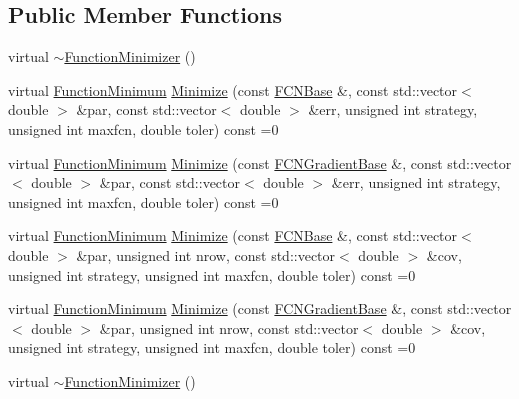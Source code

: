 \subsection*{Public Member Functions}
\begin{DoxyCompactItemize}
\item 
virtual \mbox{\hyperlink{classROOT_1_1Minuit2_1_1FunctionMinimizer_a804a5a18f04fce8e2fcbb37d2a1b714d}{$\sim$\+Function\+Minimizer}} ()
\item 
virtual \mbox{\hyperlink{classROOT_1_1Minuit2_1_1FunctionMinimum}{Function\+Minimum}} \mbox{\hyperlink{classROOT_1_1Minuit2_1_1FunctionMinimizer_aa664d755554be28f42be8270b8c35139}{Minimize}} (const \mbox{\hyperlink{classROOT_1_1Minuit2_1_1FCNBase}{F\+C\+N\+Base}} \&, const std\+::vector$<$ double $>$ \&par, const std\+::vector$<$ double $>$ \&err, unsigned int strategy, unsigned int maxfcn, double toler) const =0
\item 
virtual \mbox{\hyperlink{classROOT_1_1Minuit2_1_1FunctionMinimum}{Function\+Minimum}} \mbox{\hyperlink{classROOT_1_1Minuit2_1_1FunctionMinimizer_ac6063af1cb58f0fd75b16d3cebc49f54}{Minimize}} (const \mbox{\hyperlink{classROOT_1_1Minuit2_1_1FCNGradientBase}{F\+C\+N\+Gradient\+Base}} \&, const std\+::vector$<$ double $>$ \&par, const std\+::vector$<$ double $>$ \&err, unsigned int strategy, unsigned int maxfcn, double toler) const =0
\item 
virtual \mbox{\hyperlink{classROOT_1_1Minuit2_1_1FunctionMinimum}{Function\+Minimum}} \mbox{\hyperlink{classROOT_1_1Minuit2_1_1FunctionMinimizer_a22d44dc8c018424a98ce8928ee7c5613}{Minimize}} (const \mbox{\hyperlink{classROOT_1_1Minuit2_1_1FCNBase}{F\+C\+N\+Base}} \&, const std\+::vector$<$ double $>$ \&par, unsigned int nrow, const std\+::vector$<$ double $>$ \&cov, unsigned int strategy, unsigned int maxfcn, double toler) const =0
\item 
virtual \mbox{\hyperlink{classROOT_1_1Minuit2_1_1FunctionMinimum}{Function\+Minimum}} \mbox{\hyperlink{classROOT_1_1Minuit2_1_1FunctionMinimizer_a467a9dd60665c9b31969fe55d73b6401}{Minimize}} (const \mbox{\hyperlink{classROOT_1_1Minuit2_1_1FCNGradientBase}{F\+C\+N\+Gradient\+Base}} \&, const std\+::vector$<$ double $>$ \&par, unsigned int nrow, const std\+::vector$<$ double $>$ \&cov, unsigned int strategy, unsigned int maxfcn, double toler) const =0
\item 
virtual \mbox{\hyperlink{classROOT_1_1Minuit2_1_1FunctionMinimizer_a804a5a18f04fce8e2fcbb37d2a1b714d}{$\sim$\+Function\+Minimizer}} ()
\item 

\end{DoxyCompactItemize}
